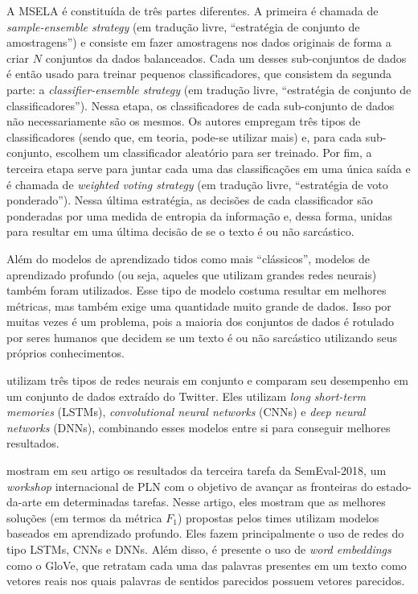 A MSELA é constituída de três partes diferentes. A primeira é chamada de
\textit{sample-ensemble strategy} (em tradução livre, ``estratégia de conjunto
de amostragens'') e consiste em fazer amostragens nos dados originais de forma a
criar $N$ conjuntos da dados balanceados. Cada um desses sub-conjuntos de dados
é então usado para treinar pequenos classificadores, que consistem da segunda
parte: a \textit{classifier-ensemble strategy} (em tradução livre, ``estratégia
de conjunto de classificadores''). Nessa etapa, os classificadores de cada
sub-conjunto de dados não necessariamente são os mesmos. Os autores empregam
três tipos de classificadores (sendo que, em teoria, pode-se utilizar mais) e,
para cada sub-conjunto, escolhem um classificador aleatório para ser treinado.
Por fim, a terceira etapa serve para juntar cada uma das classificações em uma
única saída e é chamada de \textit{weighted voting strategy} (em tradução livre,
``estratégia de voto ponderado''). Nessa última estratégia, as decisões de cada
classificador são ponderadas por uma medida de entropia da informação e, dessa
forma, unidas para resultar em uma última decisão de se o texto é ou não
sarcástico.

Além do modelos de aprendizado tidos como mais ``clássicos'', modelos de
aprendizado profundo (ou seja, aqueles que utilizam grandes redes neurais)
também foram utilizados. Esse tipo de modelo costuma resultar em melhores
métricas, mas também exige uma quantidade muito grande de dados. Isso por muitas
vezes é um problema, pois a maioria dos conjuntos de dados é rotulado por seres
humanos que decidem se um texto é ou não sarcástico utilizando seus próprios
conhecimentos.

\cite{ghosh-veale:2016:fracking-sarcasm-nn} utilizam três tipos de redes neurais
em conjunto e comparam seu desempenho em um conjunto de dados extraído do
Twitter. Eles utilizam \textit{long short-term memories} (LSTMs),
\textit{convolutional neural networks} (CNNs) e \textit{deep neural networks}
(DNNs), combinando esses modelos entre si para conseguir melhores resultados.

\cite{van-hee-etal:2018:semeval} mostram em seu artigo os resultados da terceira
tarefa da SemEval-2018, um \textit{workshop} internacional de PLN com o objetivo
de avançar as fronteiras do estado-da-arte em determinadas tarefas. Nesse
artigo, eles mostram que as melhores soluções (em termos da métrica $F_1$)
propostas pelos times utilizam modelos baseados em aprendizado profundo. Eles
fazem principalmente o uso de redes do tipo LSTMs, CNNs e DNNs. Além disso, é
presente o uso de \textit{word embeddings} como o GloVe, que retratam cada uma
das palavras presentes em um texto como vetores reais nos quais palavras de
sentidos parecidos possuem vetores parecidos.

